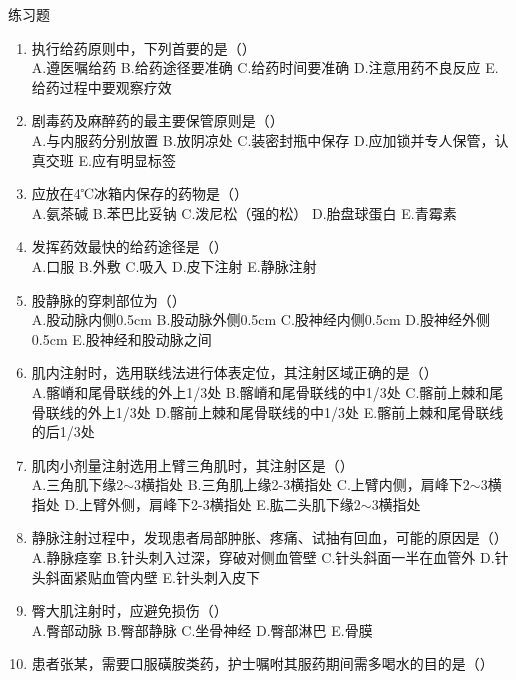 \documentclass[11pt, a4paper]{ctexart}
\begin{document}
\begin{examplebox}{练习题}
	\begin{enumerate}
		\item 执行给药原则中，下列首要的是（\qquad）\\
		      A.遵医嘱给药 \quad B.给药途径要准确 \quad C.给药时间要准确 \quad D.注意用药不良反应 \quad E.给药过程中要观察疗效
		\item 剧毒药及麻醉药的最主要保管原则是（\qquad）\\
		      A.与内服药分别放置 \quad B.放阴凉处 \quad C.装密封瓶中保存 \quad D.应加锁并专人保管，认真交班 \quad E.应有明显标签
		\item 应放在4℃冰箱内保存的药物是（\qquad）\\
		      A.氨茶碱 \quad B.苯巴比妥钠 \quad C.泼尼松（强的松） \quad D.胎盘球蛋白 \quad E.青霉素
		\item 发挥药效最快的给药途径是（\qquad）\\
		      A.口服 \quad B.外敷 \quad C.吸入 \quad D.皮下注射 \quad E.静脉注射
		\item 股静脉的穿刺部位为（\qquad）\\
		      A.股动脉内侧0.5cm \quad B.股动脉外侧0.5cm \quad C.股神经内侧0.5cm \quad D.股神经外侧0.5cm \quad E.股神经和股动脉之间
		\item 肌内注射时，选用联线法进行体表定位，其注射区域正确的是（\qquad）\\
		      A.髂嵴和尾骨联线的外上1/3处 \quad B.髂嵴和尾骨联线的中1/3处 \quad C.髂前上棘和尾骨联线的外上1/3处 \quad D.髂前上棘和尾骨联线的中1/3处 \quad E.髂前上棘和尾骨联线的后1/3处
		\item 肌肉小剂量注射选用上臂三角肌时，其注射区是（\qquad）\\
		      A.三角肌下缘2$\sim$3横指处 \quad B.三角肌上缘2-3横指处 \quad C.上臂内侧，肩峰下2$\sim$3横指处 \quad D.上臂外侧，肩峰下2-3横指处 \quad E.肱二头肌下缘2$\sim$3横指处
		\item 静脉注射过程中，发现患者局部肿胀、疼痛、试抽有回血，可能的原因是（\qquad）\\
		      A.静脉痉挛 \quad B.针头刺入过深，穿破对侧血管壁 \quad C.针头斜面一半在血管外 \quad D.针头斜面紧贴血管内壁 \quad E.针头刺入皮下
		\item 臀大肌注射时，应避免损伤（\qquad）\\
		      A.臀部动脉 \quad B.臀部静脉 \quad C.坐骨神经 \quad D.臀部淋巴 \quad E.骨膜
		\item 患者张某，需要口服磺胺类药，护士嘱咐其服药期间需多喝水的目的是（\qquad）\\

\end{enumerate}
\end{examplebox}
\end{document}
